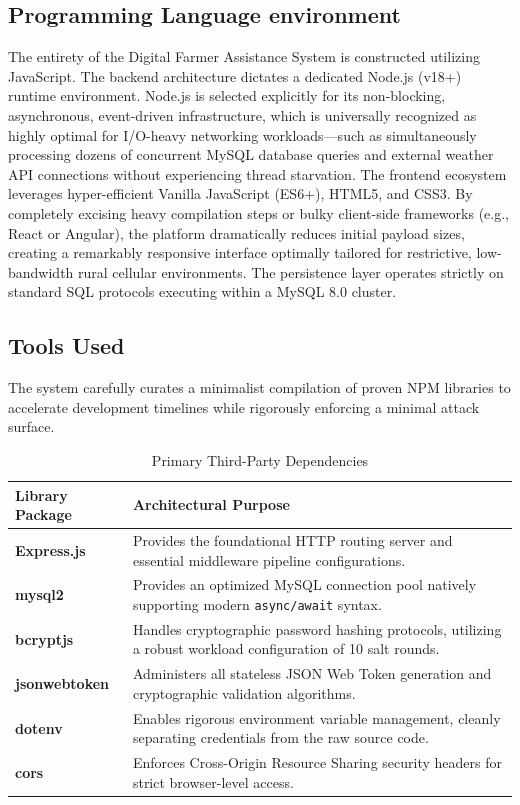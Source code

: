 \subsection{Programming Language environment}
The entirety of the Digital Farmer Assistance System is constructed utilizing JavaScript. The backend architecture dictates a dedicated Node.js (v18+) runtime environment. Node.js is selected explicitly for its non-blocking, asynchronous, event-driven infrastructure, which is universally recognized as highly optimal for I/O-heavy networking workloads—such as simultaneously processing dozens of concurrent MySQL database queries and external weather API connections without experiencing thread starvation. The frontend ecosystem leverages hyper-efficient Vanilla JavaScript (ES6+), HTML5, and CSS3. By completely excising heavy compilation steps or bulky client-side frameworks (e.g., React or Angular), the platform dramatically reduces initial payload sizes, creating a remarkably responsive interface optimally tailored for restrictive, low-bandwidth rural cellular environments. The persistence layer operates strictly on standard SQL protocols executing within a MySQL 8.0 cluster.

\subsection{Tools Used}
The system carefully curates a minimalist compilation of proven NPM libraries to accelerate development timelines while rigorously enforcing a minimal attack surface.

\begin{table}[H]
\centering
\caption{Primary Third-Party Dependencies}
\label{tab:dependencies}
\begingroup\footnotesize\begin{tabular}{>{\bfseries}p{3cm} p{10cm}}
\toprule
Library Package & Architectural Purpose \\
\midrule
Express.js & Provides the foundational HTTP routing server and essential middleware pipeline configurations. \\
\addlinespace
mysql2 & Provides an optimized MySQL connection pool natively supporting modern \texttt{async/await} syntax. \\
\addlinespace
bcryptjs & Handles cryptographic password hashing protocols, utilizing a robust workload configuration of 10 salt rounds. \\
\addlinespace
jsonwebtoken & Administers all stateless JSON Web Token generation and cryptographic validation algorithms. \\
\addlinespace
dotenv & Enables rigorous environment variable management, cleanly separating credentials from the raw source code. \\
\addlinespace
cors & Enforces Cross-Origin Resource Sharing security headers for strict browser-level access. \\
\bottomrule
\end{tabular}\endgroup
\end{table}

